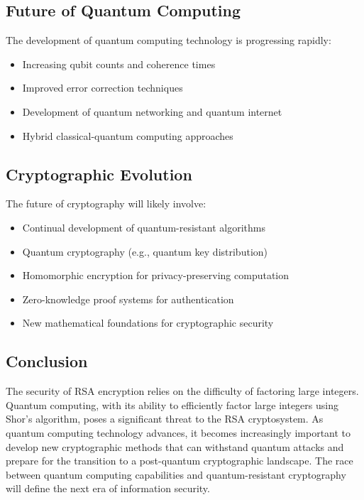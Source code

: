 \documentclass{article}
\begin{document}
\subsection{Future of Quantum Computing}
The development of quantum computing technology is progressing rapidly:
\begin{itemize}
    \item Increasing qubit counts and coherence times
    \item Improved error correction techniques
    \item Development of quantum networking and quantum internet
    \item Hybrid classical-quantum computing approaches
\end{itemize}

\subsection{Cryptographic Evolution}
The future of cryptography will likely involve:
\begin{itemize}
    \item Continual development of quantum-resistant algorithms
    \item Quantum cryptography (e.g., quantum key distribution)
    \item Homomorphic encryption for privacy-preserving computation
    \item Zero-knowledge proof systems for authentication
    \item New mathematical foundations for cryptographic security
\end{itemize}

\subsection{Conclusion}
The security of RSA encryption relies on the difficulty of factoring large integers. Quantum computing, with its ability to efficiently factor large integers using Shor's algorithm, poses a significant threat to the RSA cryptosystem. As quantum computing technology advances, it becomes increasingly important to develop new cryptographic methods that can withstand quantum attacks and prepare for the transition to a post-quantum cryptographic landscape. The race between quantum computing capabilities and quantum-resistant cryptography will define the next era of information security.

\newpage
\appendix
\end{document}
